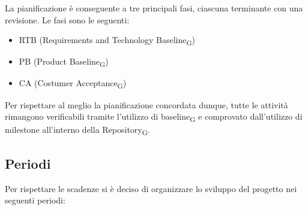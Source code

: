 \documentclass{article}
\begin{document}
La pianificazione è conseguente a tre principali fasi, ciascuna terminante con una revisione. Le fasi sono le seguenti:
\begin{itemize}
    \item RTB (Requirements and Technology Baseline\textsubscript{G})
    \item PB (Product Baseline\textsubscript{G})
    \item CA (Costumer Acceptance\textsubscript{G})
\end{itemize}
Per rispettare al meglio la pianificazione concordata dunque, tutte le  attività rimangono verificabili tramite l’utilizzo di baseline\textsubscript{G} e comprovato dall’utilizzo di milestone all'interno della Repository\textsubscript{G}.

\subsection{Periodi}
Per rispettare le scadenze si è deciso di organizzare lo sviluppo del progetto nei seguenti periodi:
\end{document}
